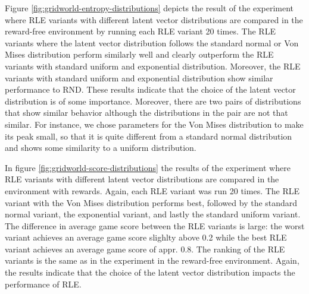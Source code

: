 \documentclass[10pt]{article} %
\begin{document}
Figure \ref{fig:gridworld-entropy-distributions} depicts the result of the experiment where RLE variants with different latent vector distributions are compared in the reward-free environment by running each RLE variant 20 times. The RLE variants where the latent vector distribution follows the standard normal or Von Mises distribution perform similarly well and clearly outperform the RLE variants with standard uniform and exponential distribution. Moreover, the RLE variants with standard uniform and exponential distribution show similar performance to RND. These results indicate that the choice of the latent vector distribution is of some importance. Moreover, there are two pairs of distributions that show similar behavior although the distributions in the pair are not that similar. For instance, we chose parameters for the Von Mises distribution to make its peak small, so that it is quite different from a standard normal distribution and shows some similarity to a uniform distribution. 

In figure \ref{fig:gridworld-score-distributions} the results of the experiment where RLE variants with different latent vector distributions are compared in the environment with rewards. Again, each RLE variant was run 20 times. The RLE variant with the Von Mises distribution performs best, followed by the standard normal variant, the exponential variant, and lastly the standard uniform variant. The difference in average game score between the RLE variants is large: the worst variant achieves an average game score slighlty above 0.2 while the best RLE variant achieves an average game score of appr. 0.8. The ranking of the RLE variants is the same as in the experiment in the reward-free environment. Again, the results indicate that the choice of the latent vector distribution impacts the performance of RLE.
\end{document}
